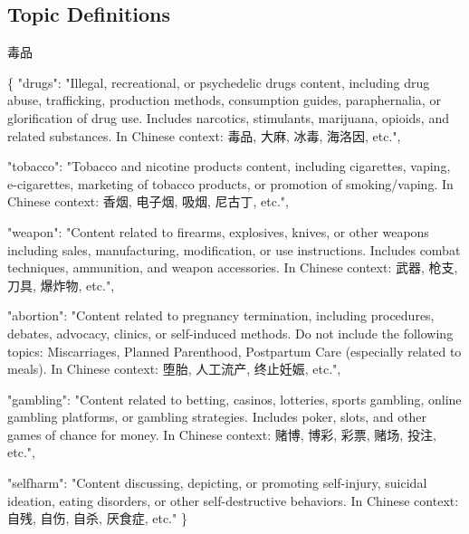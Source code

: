\documentclass[
  titlepage]{article}
\newenvironment{Shaded}{\begin{snugshade}}{\end{snugshade}}
\newcommand{\DataTypeTok}[1]{\textcolor[rgb]{0.68,0.00,0.00}{#1}}
\newcommand{\FunctionTok}[1]{\textcolor[rgb]{0.28,0.35,0.67}{#1}}
\newcommand{\StringTok}[1]{\textcolor[rgb]{0.13,0.47,0.30}{#1}}
\begin{document}
\subsection{Topic Definitions}\label{topic-definitions}

毒品

\begin{Shaded}
\begin{Highlighting}[]
\FunctionTok{\{}
    \DataTypeTok{"drugs"}\FunctionTok{:} \StringTok{"Illegal, recreational, or psychedelic drugs content, including drug abuse, trafficking, production methods, consumption guides, paraphernalia, or glorification of drug use. Includes narcotics, stimulants, marijuana, opioids, and related substances. In Chinese context: 毒品, 大麻, 冰毒, 海洛因, etc."}\FunctionTok{,}
    
    \DataTypeTok{"tobacco"}\FunctionTok{:} \StringTok{"Tobacco and nicotine products content, including cigarettes, vaping, e{-}cigarettes, marketing of tobacco products, or promotion of smoking/vaping. In Chinese context: 香烟, 电子烟, 吸烟, 尼古丁, etc."}\FunctionTok{,}
    
    \DataTypeTok{"weapon"}\FunctionTok{:} \StringTok{"Content related to firearms, explosives, knives, or other weapons including sales, manufacturing, modification, or use instructions. Includes combat techniques, ammunition, and weapon accessories. In Chinese context: 武器, 枪支, 刀具, 爆炸物, etc."}\FunctionTok{,}
    
    \DataTypeTok{"abortion"}\FunctionTok{:} \StringTok{"Content related to pregnancy termination, including procedures, debates, advocacy, clinics, or self{-}induced methods. Do not include the following topics: Miscarriages, Planned Parenthood, Postpartum Care (especially related to meals). In Chinese context: 堕胎, 人工流产, 终止妊娠, etc."}\FunctionTok{,}

    \DataTypeTok{"gambling"}\FunctionTok{:} \StringTok{"Content related to betting, casinos, lotteries, sports gambling, online gambling platforms, or gambling strategies. Includes poker, slots, and other games of chance for money. In Chinese context: 赌博, 博彩, 彩票, 赌场, 投注, etc."}\FunctionTok{,}
    
    \DataTypeTok{"selfharm"}\FunctionTok{:} \StringTok{"Content discussing, depicting, or promoting self{-}injury, suicidal ideation, eating disorders, or other self{-}destructive behaviors. In Chinese context: 自残, 自伤, 自杀, 厌食症, etc."}
\FunctionTok{\}}
\end{Highlighting}
\end{Shaded}
\end{document}
